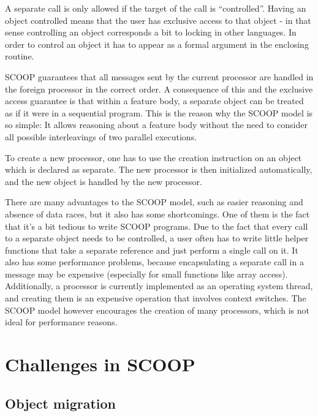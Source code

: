 \documentclass[a4paper,10pt]{article}
\begin{document}
A separate call is only allowed if the target of the call is ``controlled''.
Having an object controlled means that the user has exclusive access to that object - in that sense controlling an object corresponds a bit to locking in other languages.
In order to control an object it has to appear as a formal argument in the enclosing routine.

SCOOP guarantees that all messages sent by the current processor are handled in the foreign processor in the correct order.
A consequence of this and the exclusive access guarantee is that within a feature body, a separate object can be treated as if it were in a sequential program.
This is the reason why the SCOOP model is so simple: 
It allows reasoning about a feature body without the need to consider all possible interleavings of two parallel executions.

To create a new processor, one has to use the creation instruction on an object which is declared as separate.
The new processor is then initialized automatically, and the new object is handled by the new processor.


There are many advantages to the SCOOP model, such as easier reasoning and absence of data races, but it also has some shortcomings.
One of them is the fact that it's a bit tedious to write SCOOP programs.
Due to the fact that every call to a separate object needs to be controlled, a user often has to write little helper functions that take a separate reference and just perform a single call on it.
It also has some performance problems, because encapsulating a separate call in a message may be expensive (especially for small functions like array access).
Additionally, a processor is currently implemented as an operating system thread, and creating them is an expensive operation that involves context switches.
The SCOOP model however encourages the creation of many processors, which is not ideal for performance reasons.

\section{Challenges in SCOOP}
\label{sec:scoop-challenges}

\subsection{Object migration}
\label{sec:object-migration}
\end{document}
